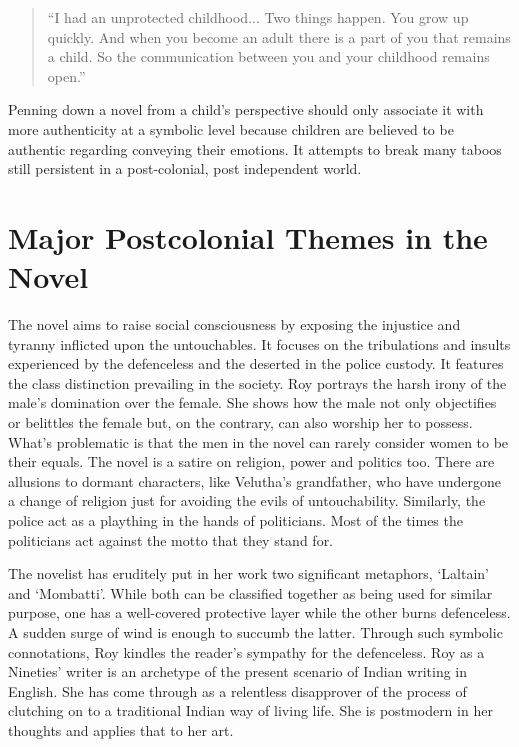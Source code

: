 \begin{quote}
    “I  had  an  unprotected  childhood...  Two  things  happen.  You  grow  up  quickly.  And  when  you  become  an  adult  there  is  a  part  of  you  that  remains  a  child.  So  the  communication  between  you  and  your  childhood  remains  open.”  \parencite{Abraham}
\end{quote}

Penning  down  a  novel  from  a  child’s  perspective  should  only  associate  it  with  more  authenticity  at  a  symbolic  level  because  children  are  believed  to  be  authentic  regarding  conveying  their  emotions.  It  attempts  to  break  many  taboos  still  persistent  in  a  post-colonial,  post  independent  world.

\section{Major Postcolonial Themes in the Novel}

The  novel  aims  to  raise  social  consciousness  by  exposing  the  injustice  and  tyranny  inflicted  upon  the  untouchables.  It  focuses  on  the  tribulations  and  insults  experienced  by  the  defenceless  and  the  deserted  in  the  police  custody.  It  features  the  class  distinction  prevailing  in  the  society.  Roy  portrays  the  harsh  irony  of  the  male’s  domination  over  the  female.  She  shows  how  the  male  not  only  objectifies  or  belittles  the  female  but,  on  the  contrary,  can  also  worship  her  to  possess.  What’s  problematic  is  that  the  men  in  the  novel  can  rarely  consider  women  to  be  their  equals.  The  novel  is  a  satire  on  religion,  power  and  politics  too.  There  are  allusions  to  dormant  characters,  like  Velutha’s  grandfather,  who  have  undergone  a  change  of  religion  just  for  avoiding  the  evils  of  untouchability.  Similarly,  the  police  act  as  a  plaything  in  the  hands  of  politicians.  Most  of  the  times  the  politicians  act  against  the  motto  that  they  stand  for.

The  novelist  has  eruditely  put  in  her  work  two  significant  metaphors,  ‘Laltain’  and  ‘Mombatti’.  While  both  can  be  classified  together  as  being  used  for  similar  purpose,  one  has  a  well-covered  protective  layer  while  the  other  burns  defenceless.  A  sudden  surge  of  wind  is  enough  to  succumb  the  latter.  Through  such  symbolic  connotations,  Roy  kindles  the  reader’s  sympathy  for  the  defenceless.  Roy  as  a  Nineties’  writer  is  an  archetype  of  the  present  scenario  of  Indian  writing  in  English.  She  has  come  through  as  a  relentless  disapprover  of  the  process  of  clutching  on  to  a  traditional  Indian  way  of  living  life.  She  is  postmodern  in  her  thoughts  and  applies  that  to  her  art.


